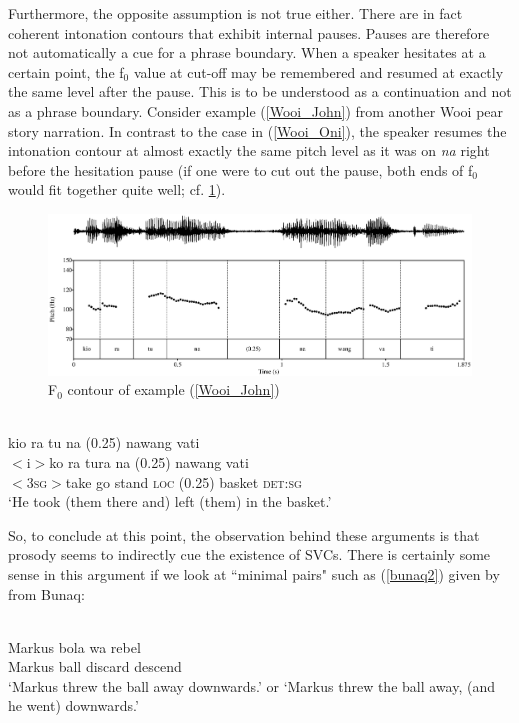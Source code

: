 Furthermore, the opposite assumption is not true either. There are in fact coherent intonation contours that exhibit internal pauses. Pauses are therefore not automatically a cue for a phrase boundary. When a speaker hesitates at a certain point, the f$_0$ value at cut-off may be remembered and resumed at exactly the same level after the pause. This is to be understood as a continuation and not as a phrase boundary. Consider example (\ref{Wooi_John}) from another Wooi pear story narration. In contrast to the case in (\ref{Wooi_Oni}), the speaker resumes the intonation contour at almost exactly the same pitch level as it was on \textit{na} right before the hesitation pause (if one were to cut out the pause, both ends of f$_0$ would fit together quite well; cf. \ref{fig:Wooi_John}).

\begin{figure}
\includegraphics[width=\textwidth]{figures/pearJohnHESIT.eps} 
\caption{F$_0$ contour of example (\ref{Wooi_John})}\label{fig:Wooi_John}
\end{figure}

\ea \label{Wooi_John}
\\
\glll kio ra tu na (0.25) nawang vati \\
$<$i$>$ko ra tura na (0.25) nawang vati \\
$<$3\textsc{sg}$>$take go stand \textsc{loc} (0.25) basket \textsc{det}:\textsc{sg} \\
\glft `He took (them there and) left (them) in the basket.' \\ 
\z

So, to conclude at this point, the observation behind these arguments is that prosody seems to indirectly cue the existence of SVCs. There is certainly some sense in this argument if we look at ``minimal pairs" such as (\ref{bunaq2}) given by \citet{schapper2009bunaq} from Bunaq:

\ea \label{bunaq2} 
\\
\gll Markus bola wa rebel \\
Markus ball discard descend \\
\glft `Markus threw the ball away downwards.’ or `Markus threw the ball away, (and he went) downwards.’\\ 
\z

